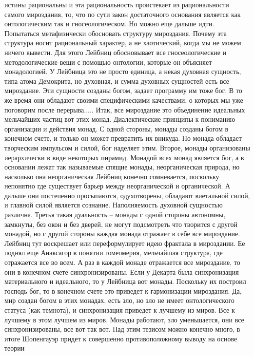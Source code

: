 \documentclass[a4paper, 12pt]{article}
\begin{document}
истины рациональны и эта рациональность проистекает из рациональности 
самого мироздания, то, что по сути закон достаточного основания является 
как онтологическим так и гносеологическом. Но можно еще дальше идти. 
Попытаться метафизически обосновать структуру мироздания. Почему эта 
структура носит рациональный характер, а не хаотический, когда мы не 
можем ничего вывести. Для этого Лейбниц обосновывает все 
гносеологические и методологические вещи с помощью онтологии, которые он 
объясняет монадологией. У Лейбница это не просто единица, а некая 
духовная сущность, типа атома Демокрита, но духовная, и сумма духовных 
сущностей есть все мироздание. Эти сущности созданы богом, задает 
программу им тоже бог. В то же время они обладают своими специфическими 
качествами, о которых мы уже поговорим после перерыва..... Итак, все 
мироздание это объединение идеальных мельчайших частиц вот этих монад. 
Диалектические принципы к пониманию организации и действия монад. 
С одной стороны, монады созданы богом в конечном счете, и только он 
может превратить их вникуда. Но монада обладает творческим импульсом 
и силой, бог наделяет этим. Второе, монады организованы иерархически 
в виде некоторых пирамид. Монадой всех монад является бог, а в основании 
лежат так называемые спящие монады, неорганическая природа, но насколько 
она неорганическая Лейбниц конечно сомневается, поскольку непонятно где 
существует барьер между неорганической и органической. А дальше они 
постепенно просыпаются, одухотворены, обладают виетальной силой, 
и главной силой является сознание. Наполняемость духовной сущностью 
различна. Третья такая дуальность -- монады с одной стороны автономны, 
замкнуты, без окон и без дверей, не могут подсмотреть что творится 
с другой монадой, но с другой стороны каждая монада отражает в себе все 
мироздание. Лейбниц тут воскрешает или переформулирует идею фрактала 
в мироздании. Ее поднял еще Анаксагор в понятии гомеомерия, мельчайшая 
структура, где отражается все во всем. А раз в каждой монаде отражается 
все мироздание, то они в конечном счете синхронизированы. Если у Декарта 
была синхронизация материального и идеального, то у Лейбница вот монады. 
Поскольку их построил господь бог, то в конечном счете это приведет 
к гармонизации мироздания. Да, мир создан богом в этих монадах, есть 
зло, но зло не имеет онтологического статуса (как темнота), 
и синхронизация приведет к лучшему из миров. Все к лучшему в этом лучшем 
из миров. Монады работают, зло уменьшается, они все синхронизированы, 
все вот так вот. Над этим тезисом можно конечно много, в итоге 
Шопенгауэр придет к совершенно противоположному выводу на основе теории 
\end{document}
